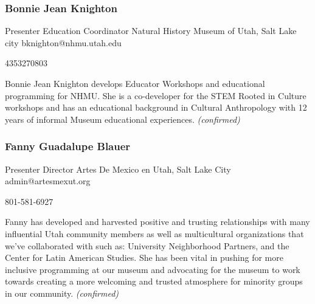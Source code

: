 \documentclass{report}
\begin{document}
              

              
                \subsubsection*{ Bonnie Jean Knighton }
                Presenter\newline
                Education Coordinator\newline
                Natural History Museum of Utah, Salt Lake city
                \newline
                bknighton@nhmu.utah.edu\newline
                
                4353270803\newline

                Bonnie Jean Knighton develops Educator Workshops and educational programming for NHMU. She is a co-developer for the STEM Rooted in Culture workshops and has an educational background in Cultural Anthropology with 12 years of informal Museum educational experiences.
                \emph{ (confirmed) }
              

              
                \subsubsection*{ Fanny Guadalupe Blauer }
                Presenter\newline
                Director\newline
                Artes De Mexico en Utah, Salt Lake City
                \newline
                admin@artesmexut.org\newline
                
                801-581-6927\newline

                Fanny has developed and harvested positive and trusting relationships with many influential Utah community members as well as multicultural organizations that we’ve collaborated with such as: University Neighborhood Partners, and the Center for Latin American Studies. She has been vital in pushing for more inclusive programming at our museum and advocating for the museum to work towards creating a more welcoming and trusted atmosphere for minority groups in our community.
                \emph{ (confirmed) }
              
\end{document}
